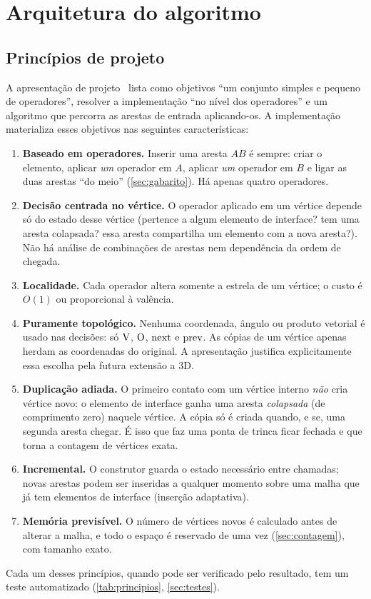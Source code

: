 \section{Arquitetura do algoritmo}
\label{sec:arquitetura}

\subsection{Princípios de projeto}

A apresentação de projeto~\cite{slides} lista como objetivos ``um conjunto simples e pequeno de operadores'', resolver
a implementação ``no nível dos operadores'' e um algoritmo que percorra as arestas de entrada aplicando-os. A
implementação materializa esses objetivos nas seguintes características:

\begin{enumerate}[label=\textbf{P\arabic*.}, leftmargin=2.2em]
\item \textbf{Baseado em operadores.} Inserir uma aresta $AB$ é sempre: criar o elemento, aplicar \emph{um} operador em
$A$, aplicar \emph{um} operador em $B$ e ligar as duas arestas ``do meio'' (\cref{sec:gabarito}). Há apenas quatro
operadores.
\item \textbf{Decisão centrada no vértice.} O operador aplicado em um vértice depende só do estado desse vértice
(pertence a algum elemento de interface? tem uma aresta colapsada? essa aresta compartilha um elemento com a nova
aresta?). Não há análise de combinações de arestas nem dependência da ordem de chegada.
\item \textbf{Localidade.} Cada operador altera somente a estrela de um vértice; o custo é $O(1)$ ou proporcional à
valência.
\item \textbf{Puramente topológico.} Nenhuma coordenada, ângulo ou produto vetorial é usado nas decisões: só $\mathrm{V}$,
$\mathrm{O}$, $\mathrm{next}$ e $\mathrm{prev}$. As cópias de um vértice apenas herdam as coordenadas do original. A apresentação justifica
explicitamente essa escolha pela futura extensão a 3D.
\item \textbf{Duplicação adiada.} O primeiro contato com um vértice interno \emph{não} cria vértice novo: o elemento de
interface ganha uma aresta \emph{colapsada} (de comprimento zero) naquele vértice. A cópia só é criada quando, e se,
uma segunda aresta chegar. É isso que faz uma ponta de trinca ficar fechada e que torna a contagem de vértices exata.
\item \textbf{Incremental.} O construtor guarda o estado necessário entre chamadas; novas arestas podem ser inseridas a
qualquer momento sobre uma malha que já tem elementos de interface (inserção adaptativa).
\item \textbf{Memória previsível.} O número de vértices novos é calculado antes de alterar a malha, e todo o espaço é
reservado de uma vez (\cref{sec:contagem}), com tamanho exato.
\end{enumerate}
Cada um desses princípios, quando pode ser verificado pelo resultado, tem um teste automatizado
(\cref{tab:principios}, \cref{sec:testes}).

